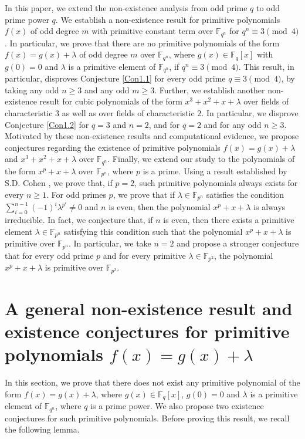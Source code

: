 \documentclass[preprint,12pt]{elsarticle}
\begin{document}
    In this paper, we extend the non-existence analysis from odd prime $q$ to odd prime power $q$. We establish a non-existence result for primitive polynomials $f(x)$ of odd degree $m$ with primitive constant term over $\mathbb{F}_{q^n}$ for $q^n\equiv 3\pmod 4$. In particular, we prove that there are no primitive polynomials of the form $f(x)=g(x)+\lambda$ of odd degree $m$ over $\mathbb{F}_{q^n}$, where $g(x)\in\mathbb{F}_{q}[x]$ with $g(0)=0$ and $\lambda$ is a primitive element of $\mathbb{F}_{q^n}$, if $q^n\equiv 3\pmod 4$. This result, in particular, disproves Conjecture \ref{Con1.1} for every odd prime $q\equiv 3\pmod{4}$, by taking any odd $n\geq 3$ and any odd $m\geq 3$. Further, we establish another non-existence result for cubic polynomials of the form $x^3+x^2+x+\lambda$ over fields of characteristic $3$ as well as over fields of characteristic $2$. In particular, we disprove Conjecture \ref{Con1.2} for $q=3$ and $n=2$, and for $q=2$ and for any odd $n\geq 3$. Motivated by these non-existence results and computational evidence, we propose conjectures regarding the existence of primitive polynomials $f(x)=g(x)+\lambda$ and $x^3+x^2+x+\lambda$ over $\mathbb{F}_{q^n}$. Finally, we extend our study to the polynomials of the form $x^p+x+\lambda$ over $\mathbb{F}_{p^n}$, where $p$ is a prime. Using a result established by S.D. Cohen \cite[Theorem 1]{cohen1990primitive}, we prove that, if $p=2$, such primitive polynomials always exists for every $n\geq 1$. For odd primes $p$, we prove that if $\lambda\in\mathbb{F}_{p^n}$ satisfies the condition $\sum_{i=0}^{n-1}(-1)^i\lambda^{p^i}\neq 0$ and $n$ is even, then the polynomial $x^p+x+\lambda$ is always irreducible. In fact, we conjecture that, if $n$ is even, then there exists a primitive element $\lambda\in\mathbb{F}_{p^n}$ satisfying this condition such that the polynomial $x^p+x+\lambda$ is primitive over $\mathbb{F}_{p^n}$. In particular, we take $n=2$ and propose a stronger conjecture that for every odd prime $p$ and for every primitive $\lambda\in\mathbb{F}_{p^2}$, the polynomial $x^p+x+\lambda$ is primitive over $\mathbb{F}_{p^2}$. 

\section{A general non-existence result and existence conjectures for primitive polynomials $f(x)=g(x)+\lambda$}\label{S2}    

    In this section, we prove that there does not exist any primitive polynomial of the form $f(x)=g(x)+\lambda$, where $g(x)\in\mathbb{F}_q[x]$, $g(0)=0$ and $\lambda$ is a primitive element of $\mathbb{F}_{q^n}$, where $q$ is a prime power. We also propose two existence conjectures for such primitive polynomials. Before proving this result, we recall the following lemma.
\end{document}
